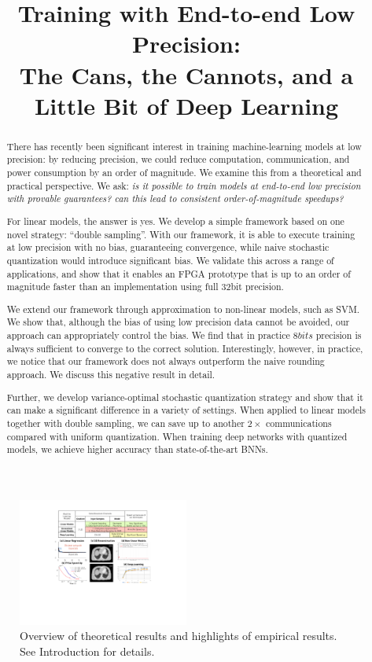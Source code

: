 \documentclass{article}
\date{}
\title{Training with End-to-end Low Precision:\\
The Cans, the Cannots, and a Little Bit of Deep Learning
}
\begin{document}
\maketitle

\begin{abstract}

There has recently been significant interest in training 
machine-learning models at low precision: by reducing 
precision, we could reduce computation, communication, and power 
consumption by an order of magnitude. 
We examine this from a theoretical and practical 
perspective. We ask: 
{\em is it possible to \emph{train} models at end-to-end low 
precision with \emph{provable} guarantees?  can this 
lead to consistent order-of-magnitude speedups?}

For linear models, the answer is yes. We develop a simple 
framework based on one novel strategy: ``double sampling''. 
With our framework, it is able 
to execute training at low precision with no bias, 
guaranteeing convergence, while naive stochastic quantization 
would introduce significant bias. We validate this  
across a range of applications, and show that it enables an 
FPGA prototype that is up to an order of magnitude faster 
than an implementation using full 32bit precision.

We extend our framework through approximation to non-linear 
models, such as SVM. We show that, although the bias of using 
low precision data cannot be avoided, our approach can appropriately 
control the bias. We find that in practice $8bits$ precision is 
always sufficient to converge to the correct solution. 
Interestingly, however, in practice, we notice that our framework 
does not always outperform the naive rounding approach. We discuss 
this negative result in detail. 

Further, we develop variance-optimal 
stochastic quantization
strategy and show that 
it can make a significant difference in a variety of settings. 
When applied to linear models together with 
double sampling, we can save up to another 
$2\times$ communications
compared with uniform quantization. When
training deep networks with quantized models, 
we achieve higher accuracy than state-of-the-art BNNs. 

\end{abstract}

\begin{figure}[t]
\centering
\includegraphics[width=0.5\textwidth]{Figures/RSHighlight}    
\vspace{-2em}
\caption{Overview of theoretical results and
highlights of empirical results. See
Introduction for details.}
\label{fig:highlight}
\end{figure}
\vspace{-2em}
\end{document}
